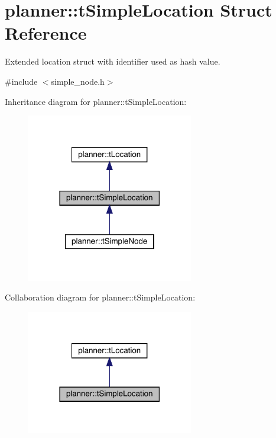 \hypertarget{structplanner_1_1t_simple_location}{}\section{planner\+:\+:t\+Simple\+Location Struct Reference}
\label{structplanner_1_1t_simple_location}


Extended location struct with identifier used as hash value.  




{\ttfamily \#include $<$simple\+\_\+node.\+h$>$}



Inheritance diagram for planner\+:\+:t\+Simple\+Location\+:\nopagebreak
\begin{figure}[H]
\begin{center}
\leavevmode
\includegraphics[width=206pt]{structplanner_1_1t_simple_location__inherit__graph}
\end{center}
\end{figure}


Collaboration diagram for planner\+:\+:t\+Simple\+Location\+:\nopagebreak
\begin{figure}[H]
\begin{center}
\leavevmode
\includegraphics[width=206pt]{structplanner_1_1t_simple_location__coll__graph}
\end{center}
\end{figure}
